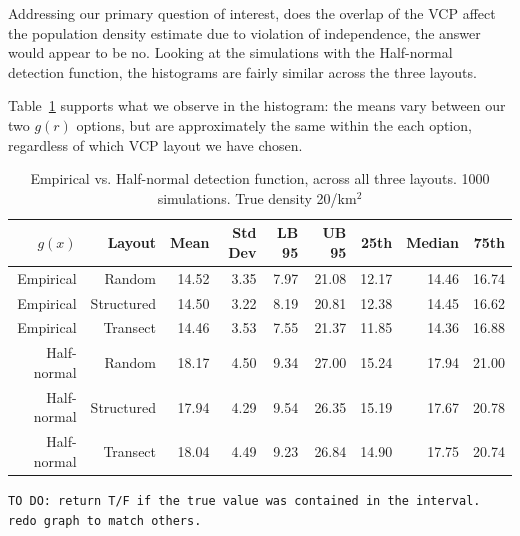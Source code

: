 \documentclass[12pt]{article}
\begin{document}
Addressing our primary question of interest, does the overlap of the VCP affect the population density estimate due to violation of independence, the answer would appear to be no. Looking at the simulations with the Half-normal detection function, the histograms are fairly similar across the three layouts. 

Table~\ref{table:sim1} supports what we observe in the histogram: the means vary between our two $g(r)$ options, but are approximately the same within the each option, regardless of which VCP layout we have chosen. 
\begin{table}[h]
	\caption{Empirical vs. Half-normal detection function, across all three layouts. 1000 simulations. True density 20/km$^2$}
	\begin{tabular}{ r r r r r r r r r}
	   $g(x)$	 & Layout		& Mean	& Std Dev	& LB 95 & UB 95	& 25th	& Median	&  75th \\ \hline \hline
	   Empirical & Random		& 14.52 & 3.35 		& 7.97	& 21.08	& 12.17	& 14.46	& 16.74\\
	   Empirical & Structured	& 14.50 & 3.22 		& 8.19 	& 20.81 & 12.38 & 14.45 & 16.62\\
	   Empirical & Transect		& 14.46 & 3.53 		& 7.55 	& 21.37 & 11.85 & 14.36 & 16.88\\ \hline
	 Half-normal & Random 		& 18.17 & 4.50 		& 9.34 	& 27.00 & 15.24 & 17.94 & 21.00\\
	 Half-normal & Structured	& 17.94 & 4.29 		& 9.54 	& 26.35 & 15.19 & 17.67 & 20.78\\
	 Half-normal & Transect		& 18.04 & 4.49 		& 9.23 	& 26.84 & 14.90 & 17.75 & 20.74\\

	\end{tabular}
	\label{table:sim1}
\end{table}



\texttt{TO DO: return T/F if the true value was contained in the interval. redo graph to match others.}
\end{document}
